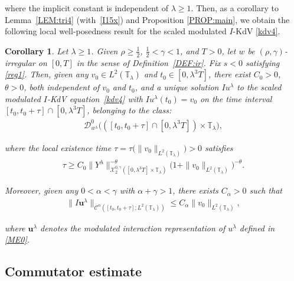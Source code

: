 \documentclass[letterpaper, 11pt,  reqno]{amsart}
\newtheorem{corollary}[theorem]{Corollary}
\newcommand{\1}{\hspace{0.5mm}\text{I}\hspace{0.5mm}}
\newcommand{\noi}{\noindent}
\newcommand{\T}{\mathbb{T}}
\newcommand{\CC}{\mathcal{C}}
\newcommand{\al}{\alpha}
\newcommand{\g}{\gamma}
\newcommand{\ld}{\lambda}
\newcommand{\ta}{\theta}
\newcommand{\cX}{\mathcal{X}}
\newcommand{\cD}{\mathscr{D}}
\newcommand{\uu}{\mathbf{u}}
\numberwithin{equation}{section}
\numberwithin{theorem}{section}
\begin{document}
\noi
where the implicit constant is independent of $\ld \ge 1$.
Then, 
as a corollary to Lemma~\ref{LEM:tri4} (with~\eqref{I15x})
and Proposition \ref{PROP:main}, 
we obtain the following local well-posedness
result for the scaled modulated $I$-KdV \eqref{kdv4}.


\begin{corollary}
\label{COR:I2}
Let $\ld \ge 1$.
Given $\rho \ge\frac 12$,  $\frac 12 < \g < 1$, and $T> 0$, 
let  $w$ be $(\rho,\g)$-irregular
on $[0, T]$ 
 in the sense of Definition~\ref{DEF:ir}.
Fix  $s < 0$ satisfying \eqref{reg1}.
Then, given any 
$v_0 \in L^2(\T_\ld)$ and  $t_0 \in [0, \ld^3 T]$, 
there exist $C_0 > 0$, $\ta > 0$, both independent of $v_0$ and $t_0$, 
and a unique solution $Iu^\ld$
to 
the scaled modulated $I$-KdV equation~\eqref{kdv4} 
with $I u^\ld (t_0)= v_0$
on the time interval $[t_0, t_0 + \tau]\cap [0, \ld^3 T]$,  
belonging to the class\textup{:}
\begin{align*}
 \cD_{w^\ld}^0\big( ([t_0, t_0 + \tau] \cap [0, \ld^3 T]) \times \T_\ld\big), 
\end{align*}


\noi
where the local existence time 
$\tau = \tau \big(\| v_0 \|_{L^2(\T_\ld)}\big)> 0$ satisfies
\begin{align}
\tau  \ge C_0 \|Y^\ld\|_{\cX^{0,\g}_2([0, \ld^3 T]\times \T_\ld)}^{-\ta} \big( 1 + \| v_0 \|_{L^2(\T_\ld)}\big)^{-\ta}.
\label{ME0a}
\end{align}

\noi
Moreover, given any $0 < \al < \g$
with $\al + \g > 1$, 
there exists $C_\al > 0$ such that 
\begin{align*}
 \| I\uu^\ld \|_{\CC^\al ([t_0, t_0 + \tau];L^2(\T_\ld))}\le C_\al 
 \|v_0\|_{L^2(\T_\ld)}, 
\end{align*}

\noi
where $\uu^\ld$ denotes the modulated interaction representation of $u^\ld$
defined in  \eqref{ME0}.




\end{corollary}









\subsection{Commutator estimate}
\label{SUBSEC:I3}
\end{document}

